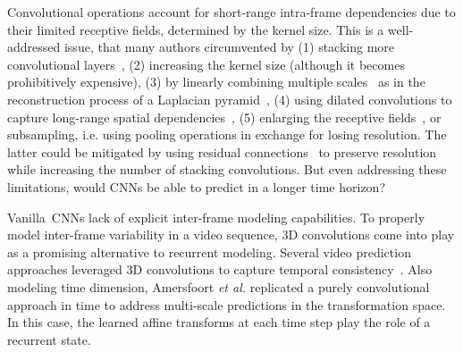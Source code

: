 Convolutional operations account for short-range intra-frame dependencies due to their limited receptive fields, determined by the kernel size. This is a well-addressed issue, that many authors circumvented by (1) stacking more convolutional layers~\cite{Jain2007}, (2) increasing the kernel size (although it becomes prohibitively expensive), (3) by linearly combining multiple scales~\cite{Mathieu2016} as in the reconstruction process of a Laplacian pyramid~\cite{Denton2015}, (4) using dilated convolutions to capture long-range spatial dependencies~\cite{Yu2017}, (5) enlarging the receptive fields~\cite{Chen2018, Luo2016}, or subsampling, i.e. using pooling operations in exchange for losing resolution. The latter could be mitigated by using residual connections~\cite{He2016,Villegas2017a} to preserve resolution while increasing the number of stacking convolutions. But even addressing these limitations, would \acp{CNN} be able to predict in a longer time horizon?

Vanilla~\acp{CNN} lack of explicit inter-frame modeling capabilities. To properly model inter-frame variability in a video sequence, 3D convolutions come into play as a promising alternative to recurrent modeling. Several video prediction approaches leveraged 3D convolutions to capture temporal consistency~\cite{Wang2019b,Vondrick2016,Tulyakov2018,Aigner2018,Zhang2019}. Also modeling time dimension, Amersfoort \textit{et al.} \cite{Amersfoort2017} replicated a purely convolutional approach in time to address multi-scale predictions in the transformation space. In this case, the learned affine transforms at each time step play the role of a recurrent state.

